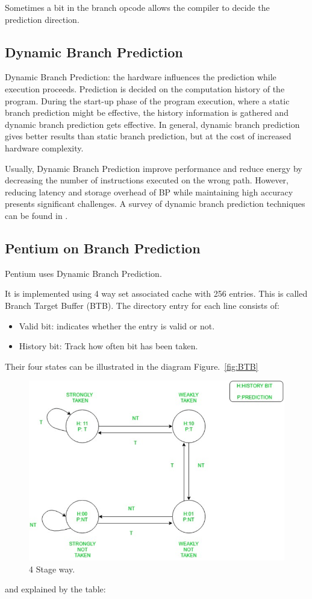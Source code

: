 \documentclass[doc,natbib,12pt]{apa6}
\begin{document}
	Sometimes a bit in the branch opcode allows the compiler to decide the prediction direction. \citep{McFarland2006}
	
	\subsection{Dynamic Branch Prediction}
	Dynamic Branch Prediction: the hardware influences the prediction while execution proceeds.
	Prediction is decided on the computation history of the program.
	During the start-up phase of the program execution, where a static branch prediction might be effective, the history information is gathered and dynamic branch prediction gets effective.
	In general, dynamic branch prediction gives better results than static branch prediction, but at the cost of increased hardware complexity. \citep{McFarland2006}
	
	Usually, Dynamic Branch Prediction improve performance and reduce energy by decreasing the number of instructions executed on the wrong path.
	However, reducing latency and storage overhead of BP while maintaining high accuracy presents significant challenges. A survey of dynamic branch prediction techniques can be found in \citep{Mittal2016}.
	
	
	\subsection{Pentium on Branch Prediction}
	Pentium uses Dynamic Branch Prediction. 
	
	It is implemented using 4 way set associated cache with 256 entries. This is called Branch Target Buffer (BTB). The directory entry for each line consists of:
	\begin{itemize}
		\item Valid bit: indicates whether the entry is valid or not.
		\item History bit: Track how often bit has been taken.
	\end{itemize}
	
	Their four states can be illustrated in the diagram Figure.~\vref{fig:BTB}
	\begin{figure}[htpb]
		\centering
		\includegraphics[width=1\textwidth]{222-15.png}
		\caption{\label{fig:BTB}4 Stage way. \citep{GeeksforGeeks}}
	\end{figure}
	and explained by the table:
	
\end{document}
